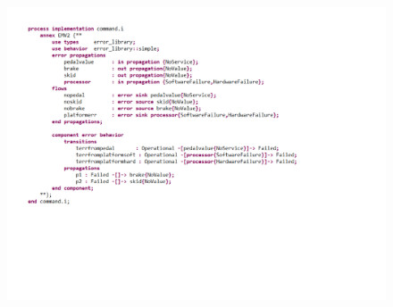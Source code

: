 \begin{figure}[h!]
	\hspace*{-4cm}
	\vspace{-0.8in} 
	\begin{center}
		\includegraphics[width=1.5\textwidth]{images/bscu_cmd_emv2.pdf}
	\end{center}
	\vspace{-2.2in}
\end{figure}






 


